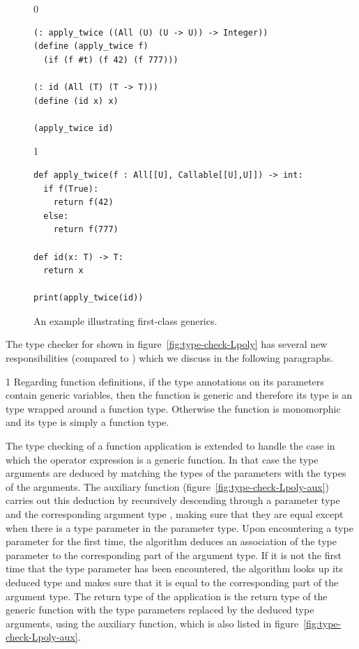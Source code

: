 \documentclass[7x10]{TimesAPriori_MIT}%
\def\racketEd{0}
\def\pythonEd{1}
\def\edition{1}
\newcommand{\pythonColor}[0]{}
\numberwithin{theorem}{chapter}
\numberwithin{definition}{chapter}
\numberwithin{equation}{chapter}
\begin{document}
\begin{figure}[tbp]
\begin{tcolorbox}[colback=white]  
{\if\edition\racketEd
\begin{lstlisting}
(: apply_twice ((All (U) (U -> U)) -> Integer))
(define (apply_twice f)
  (if (f #t) (f 42) (f 777)))

(: id (All (T) (T -> T)))
(define (id x) x)

(apply_twice id)
\end{lstlisting}
\fi}
{\if\edition\pythonEd\pythonColor
\begin{lstlisting}
def apply_twice(f : All[[U], Callable[[U],U]]) -> int:
  if f(True):
    return f(42)
  else:
    return f(777)

def id(x: T) -> T:
  return x

print(apply_twice(id))
\end{lstlisting}
\fi}
\end{tcolorbox}

\caption{An example illustrating first-class generics.}
\label{fig:apply-twice}
\end{figure}


The type checker for \LangPoly{} shown in
figure~\ref{fig:type-check-Lpoly} has several new responsibilities
(compared to \LangLam{}) which we discuss in the following paragraphs.

{\if\edition\pythonEd\pythonColor
%
Regarding function definitions, if the type annotations on its
parameters contain generic variables, then the function is generic and
therefore its type is an  type wrapped around a function
type. Otherwise the function is monomorphic and its type is simply
a function type.
%
\fi}

The type checking of a function application is extended to handle the
case in which the operator expression is a generic function. In that case
the type arguments are deduced by matching the types of the parameters
with the types of the arguments.
%
The  auxiliary function
(figure~\ref{fig:type-check-Lpoly-aux}) carries out this deduction by
recursively descending through a parameter type  and
the corresponding argument type , making sure that they
are equal except when there is a type parameter in the parameter
type. Upon encountering a type parameter for the first time, the
algorithm deduces an association of the type parameter to the
corresponding part of the argument type. If it is not the first time
that the type parameter has been encountered, the algorithm looks up
its deduced type and makes sure that it is equal to the corresponding
part of the argument type.  The return type of the application is the
return type of the generic function with the type parameters
replaced by the deduced type arguments, using the
 auxiliary function, which is also listed in
figure~\ref{fig:type-check-Lpoly-aux}.
\end{document}
